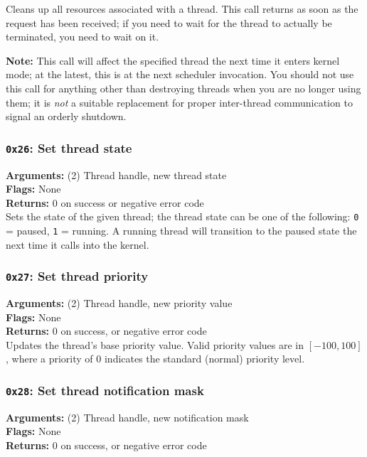 \documentclass[11pt]{article}
\begin{document}
Cleans up all resources associated with a thread. This call returns as soon as the request has been received; if you need to wait for the thread to actually be terminated, you need to wait on it.

\textbf{Note:} This call will affect the specified thread the next time it enters kernel mode; at the latest, this is at the next scheduler invocation. You should not use this call for anything other than destroying threads when you are no longer using them; it is \textit{not} a suitable replacement for proper inter-thread communication to signal an orderly shutdown.

\subsubsection{{\tt 0x26}: Set thread state}
\textbf{Arguments:} (2) Thread handle, new thread state \\
\textbf{Flags:} None \\
\textbf{Returns:} 0 on success or negative error code \\

Sets the state of the given thread; the thread state can be one of the following: \texttt{0} = paused, \texttt{1} = running. A running thread will transition to the paused state the next time it calls into the kernel.

\subsubsection{{\tt 0x27}: Set thread priority}
\textbf{Arguments:} (2) Thread handle, new priority value \\
\textbf{Flags:} None \\
\textbf{Returns:} 0 on success, or negative error code \\

Updates the thread's base priority value. Valid priority values are in $[-100, 100]$, where a priority of $0$ indicates the standard (normal) priority level.

\subsubsection{{\tt 0x28}: Set thread notification mask}
\textbf{Arguments:} (2) Thread handle, new notification mask \\
\textbf{Flags:} None \\
\textbf{Returns:} 0 on success, or negative error code \\
\end{document}
